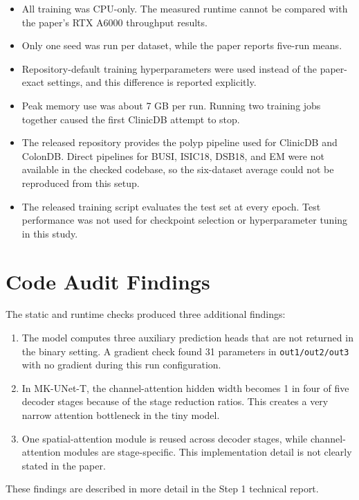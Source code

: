 \documentclass[10pt,a4paper]{article}
\begin{document}
\begin{itemize}
\item All training was CPU-only. The measured runtime cannot be compared with the paper's RTX A6000 throughput results.
\item Only one seed was run per dataset, while the paper reports five-run means.
\item Repository-default training hyperparameters were used instead of the paper-exact settings, and this difference is reported explicitly.
\item Peak memory use was about 7 GB per run. Running two training jobs together caused the first ClinicDB attempt to stop.
\item The released repository provides the polyp pipeline used for ClinicDB and ColonDB. Direct pipelines for BUSI, ISIC18, DSB18, and EM were not available in the checked codebase, so the six-dataset average could not be reproduced from this setup.
\item The released training script evaluates the test set at every epoch. Test performance was not used for checkpoint selection or hyperparameter tuning in this study.
\end{itemize}

\section{Code Audit Findings}

The static and runtime checks produced three additional findings:

\begin{enumerate}
\item The model computes three auxiliary prediction heads that are not returned in the binary setting. A gradient check found 31 parameters in \texttt{out1/out2/out3} with no gradient during this run configuration.
\item In MK-UNet-T, the channel-attention hidden width becomes 1 in four of five decoder stages because of the stage reduction ratios. This creates a very narrow attention bottleneck in the tiny model.
\item One spatial-attention module is reused across decoder stages, while channel-attention modules are stage-specific. This implementation detail is not clearly stated in the paper.
\end{enumerate}

These findings are described in more detail in the Step 1 technical report.
\end{document}
